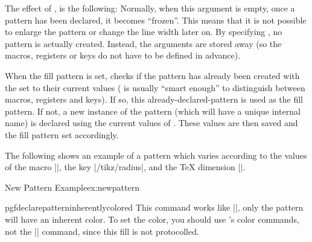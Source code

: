 	The effect of , is the following:
  Normally, when this argument is empty, once a pattern has been
  declared, it becomes ``frozen''. This means that it is not possible
  to enlarge the pattern or change the line width later on.
  By specifying , no pattern is actually created.
  Instead, the arguments are stored away
  (so the macros,	registers or keys do not have to be defined in advance).

  When the fill pattern is set, \pgfname{} checks if the pattern has
  already been created with the  set to their current
  values (\pgfname{} is usually ``smart enough'' to distinguish between
  macros, registers and keys). If so, this already-declared-pattern
  is used as the fill pattern.
  If not, a new instance of the pattern (which will have a
  unique internal name) is declared using the current values of
  . These values are then saved and the fill pattern
  set accordingly.
	
	The following shows an example of a pattern which varies
	according to the values of the macro |\size|, the key |/tikz/radius|,
	and the \TeX{} dimension |\thickness|.

\begin{texexample}{New Pattern Example}{ex:newpattern}
{}
{}
{\pgfpoint{\size}{\size}}
{
  \pgfsetlinewidth{\thickness}
  \pgfpathcircle{}
}
\newdimen\thickness
{}
\end{texexample}



\begin{docCommand}{pgfdeclarepatterninherentlycolored}{
    }
  This command works like |\pgfdeclarepatternuncolored|, only the
  pattern will have an inherent color. To set the color, you should
  use \pgfname's color commands, not the |\color| command, since this
  fill is not protocolled.
\end{docCommand}

